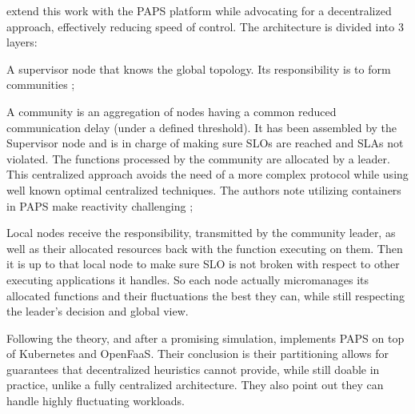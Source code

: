 \documentclass[11pt]{sdm}
\begin{document}
\begin{description}
	\citet{baresi_paps_2019, baresi_paps_2021} extend this work with the \gls{PAPS} platform while advocating for a decentralized approach, effectively reducing speed of control.
	The architecture is divided into 3 layers:
	\begin{enumerate*}[(1)]
		\item A supervisor node that knows the global topology. Its responsibility is to form communities ;
		\item A community is an aggregation of nodes having a common reduced communication delay (under a defined threshold). It has been assembled by the Supervisor node and is in charge of making sure \glspl{SLO} are reached and \glspl{SLA} not violated. The functions processed by the community are allocated by a leader. This centralized approach avoids the need of a more complex protocol while using well known optimal centralized techniques. The authors note utilizing containers in \gls{PAPS} make reactivity challenging ;
		\item Local nodes receive the responsibility, transmitted by the community leader, as well as their allocated resources back with the function executing on them. Then it is up to that local node to make sure \gls{SLO} is not broken with respect to other executing applications it handles. So each node actually micromanages its allocated functions and their fluctuations the best they can, while still respecting the leader's decision and global view.
	\end{enumerate*}
	
	Following the theory, and after a promising simulation, \citet{baresi_paps_2021} implements \gls{PAPS} on top of Kubernetes and OpenFaaS. Their conclusion is their partitioning allows for guarantees that decentralized heuristics cannot provide, while still doable in practice, unlike a fully centralized architecture. They also point out they can handle highly fluctuating workloads.
	

\end{description}
\end{document}
